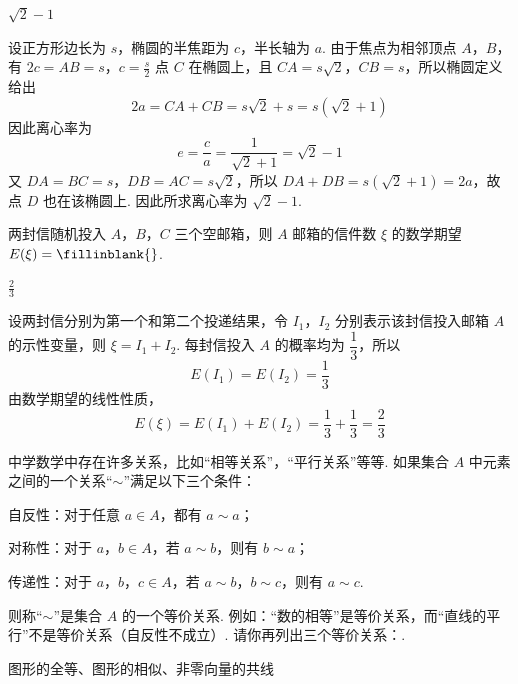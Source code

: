 \begin{answer}
\(\sqrt{2} - 1\)
\end{answer}

\begin{solution}
设正方形边长为 \(s\)，椭圆的半焦距为 \(c\)，半长轴为 \(a\). 由于焦点为相邻顶点 \(A\)，\(B\)，有
\(2c=AB=s\)，\(c=\frac{s}{2}\)
点 \(C\) 在椭圆上，且 \(CA=s\sqrt2\)，\(CB=s\)，所以椭圆定义给出
\[
2a=CA+CB=s\sqrt2+s=s(\sqrt2+1)
\]
因此离心率为
\[
e=\frac{c}{a}=\frac{1}{\sqrt2+1}=\sqrt2-1
\]
又 \(DA=BC=s\)，\(DB=AC=s\sqrt2\)，所以 \(DA+DB=s(\sqrt2+1)=2a\)，故点 \(D\) 也在该椭圆上. 因此所求离心率为 \(\sqrt2-1\).
\end{solution}

\begin{problem}
两封信随机投入 \(A\)，\(B\)，\(C\) 三个空邮箱，则 \(A\) 邮箱的信件数 \(\xi\) 的数学期望 \(E(\xi) =\fillinblank{}\).
\end{problem}

\begin{answer}
\(\frac{2}{3}\)
\end{answer}

\begin{solution}
设两封信分别为第一个和第二个投递结果，令 \(I_1\)，\(I_2\) 分别表示该封信投入邮箱 \(A\) 的示性变量，则 \(\xi=I_1+I_2\). 每封信投入 \(A\) 的概率均为 \(\dfrac13\)，所以
\[
E(I_1)=E(I_2)=\frac13
\]
由数学期望的线性性质，
\[
E(\xi)=E(I_1)+E(I_2)=\frac13+\frac13=\frac23
\]
\end{solution}

\begin{problem}
中学数学中存在许多关系，比如“相等关系”，“平行关系”等等. 如果集合 \(A\) 中元素之间的一个关系“\(\sim\)”满足以下三个条件：

\begin{circlelist}
\item 自反性：对于任意 \(a \in A\)，都有 \(a \sim a\)；
\item 对称性：对于 \(a\)，\(b \in A\)，若 \(a \sim b\)，则有 \(b \sim a\)；
\item 传递性：对于 \(a\)，\(b\)，\(c \in A\)，若 \(a \sim b\)，\(b \sim c\)，则有 \(a \sim c\).
\end{circlelist}

则称“\(\sim\)”是集合 \(A\) 的一个等价关系. 例如：“数的相等”是等价关系，而“直线的平行”不是等价关系（自反性不成立）. 请你再列出三个等价关系：\fillinblank{}.
\end{problem}

\begin{answer}
图形的全等、图形的相似、非零向量的共线
\end{answer}


